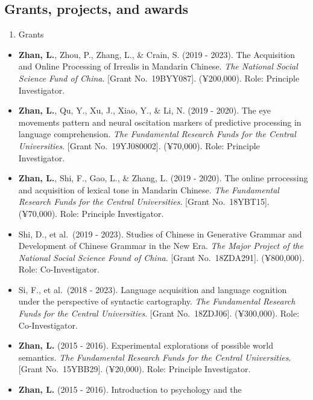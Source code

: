 \documentclass[12pt,]{article}
\providecommand{\tightlist}{%
  \setlength{\itemsep}{0pt}\setlength{\parskip}{0pt}}
\begin{document}
\hypertarget{grants-projects-and-awards}{%
\subsection{Grants, projects, and
awards}\label{grants-projects-and-awards}}

\begin{enumerate}
\def\labelenumi{\arabic{enumi}.}
\tightlist
\item
  Grants
\end{enumerate}

\begin{itemize}
\item
  \textbf{Zhan, L.}, Zhou, P., Zhang, L., \& Crain, S. (2019 - 2023).
  The Acquisition and Online Processing of Irrealis in Mandarin Chinese.
  \emph{The National Social Science Fund of China}. {[}Grant
  No.~19BYY087{]}. (¥200,000). Role: Principle Investigator.
\item
  \textbf{Zhan, L.}, Qu, Y., Xu, J., Xiao, Y., \& Li, N. (2019 - 2020).
  The eye movements pattern and neural oscitation markers of predictive
  processing in language comprehension. \emph{The Fundamental Research
  Funds for the Central Universities}. {[}Grant No.~19YJ080002{]}.
  (¥70,000). Role: Principle Investigator.
\item
  \textbf{Zhan, L.}, Shi, F., Gao, L., \& Zhang, L. (2019 - 2020). The
  online prrocessing and acquisition of lexical tone in Mandarin
  Chinese. \emph{The Fundamental Research Funds for the Central
  Universities}. {[}Grant No.~18YBT15{]}. (¥70,000). Role: Principle
  Investigator.
\item
  Shi, D., et al.~(2019 - 2023). Studies of Chinese in Generative
  Grammar and Development of Chinese Grammar in the New Era. \emph{The
  Major Project of the National Social Science Found of China}. {[}Grant
  No.~18ZDA291{]}. (¥800,000). Role: Co-Investigator.
\item
  Si, F., et al.~(2018 - 2023). Language acquisition and language
  cognition under the perspective of syntactic cartography. \emph{The
  Fundamental Research Funds for the Central Universities}. {[}Grant
  No.~18ZDJ06{]}. (¥300,000). Role: Co-Investigator.
\item
  \textbf{Zhan, L.} (2015 - 2016). Experimental explorations of possible
  world semantics. \emph{The Fundamental Research Funds for the Central
  Universities}. {[}Grant No.~15YBB29{]}. (¥20,000). Role: Principle
  Investigator.
\item
  \textbf{Zhan, L.} (2015 - 2016). Introduction to psychology and the

\end{itemize}
\end{document}

